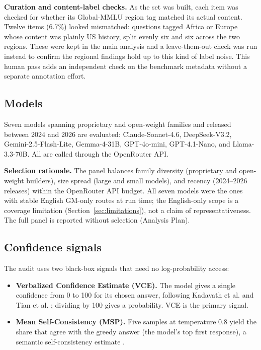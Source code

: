 \documentclass[11pt]{article}
\begin{document}
\textbf{Curation and content-label checks.} As the set was built, each item was checked for whether its Global-MMLU region tag matched its actual content. Twelve items (6.7\%) looked mismatched: questions tagged Africa or Europe whose content was plainly US history, split evenly six and six across the two regions. These were kept in the main analysis and a leave-them-out check was run instead to confirm the regional findings hold up to this kind of label noise. This human pass adds an independent check on the benchmark metadata without a separate annotation effort.

\subsection{Models}

Seven models spanning proprietary and open-weight families and released between 2024 and 2026 are evaluated: Claude-Sonnet-4.6, DeepSeek-V3.2, Gemini-2.5-Flash-Lite, Gemma-4-31B, GPT-4o-mini, GPT-4.1-Nano, and Llama-3.3-70B. All are called through the OpenRouter API.

\textbf{Selection rationale.} The panel balances family diversity (proprietary and open-weight builders), size spread (large and small models), and recency (2024--2026 releases) within the OpenRouter API budget. All seven models were the ones with stable English GM-only routes at run time; the English-only scope is a coverage limitation (Section~\ref{sec:limitations}), not a claim of representativeness. The full panel is reported without selection (Analysis Plan).

\subsection{Confidence signals}

The audit uses two black-box signals that need no log-probability access:

\begin{itemize}
    \item \textbf{Verbalized Confidence Estimate (VCE).} The model gives a single confidence from 0 to 100 for its chosen answer, following Kadavath et al. and Tian et al. \cite{kadavath2022language,tian2023just}; dividing by 100 gives a probability. VCE is the primary signal.
    \item \textbf{Mean Self-Consistency (MSP).} Five samples at temperature 0.8 yield the share that agree with the greedy answer (the model's top first response), a semantic self-consistency estimate \cite{wang2023selfconsistency,kuhn2023semantic}.
\end{itemize}
\end{document}
